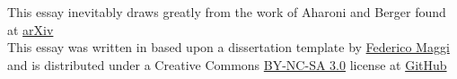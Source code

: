 \begin{acky}
This essay inevitably draws greatly from the work of Aharoni and Berger found at \href{http://arxiv.org/pdf/math/0509397.pdf}{arXiv}\\

This essay was written in \XeLaTeX based upon a dissertation template by \href{http://www.latextemplates.com/template/maggi-memoir-thesis}{Federico Maggi} and is distributed under a Creative Commons \href{https://creativecommons.org/licenses/by-nc-sa/3.0/}{BY-NC-SA 3.0} license at \href{}{GitHub}
\end{acky}